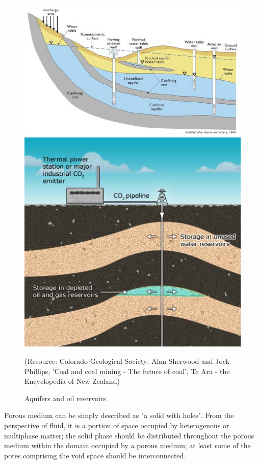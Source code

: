 \begin{figure}
	\centering
	\includegraphics[height=.2\textheight]{figs/Aquifers}
	\includegraphics[height=.2\textheight]{figs/Oil-reservoirs}
	\caption{Aquifers and oil reservoirs}
	(Resource: Colorado Geological Society; Alan Sherwood and Jock Phillips, 'Coal and coal mining - The future of coal', Te Ara - the Encyclopedia of New Zealand)
	\label{fig: Aquifers and oil reservoirs}
\end{figure}

Porous medium can be simply described as "a solid with holes". From the perspective of fluid, it is a portion of space occupied by heterogenous or multiphase matter; the solid phase should be distributed throughout the porous medium within the domain occupied by a porous medium; at least some of the pores comprising the void space should be interconnected\cite{Bear2013}.

